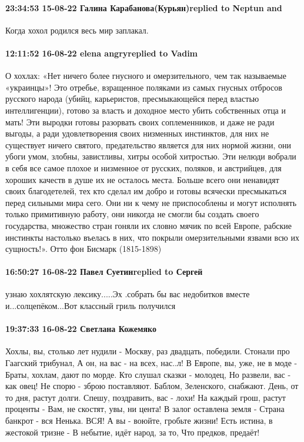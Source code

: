 \paragraph{23:34:53 15-08-22 Галина Карабанова(Курьян)replied to Neptun and}

Когда хохол родился весь мир заплакал.

\paragraph{12:11:52 16-08-22 elena angryreplied to Vadim}

\obeycr
О хохлах:
«Нет ничего более гнусного и омерзительного,
чем так называемые «украинцы»! Это отребье,
взращенное поляками из самых гнусных
отбросов русского народа (убийц, карьеристов,
пресмыкающейся перед властью интеллигенции),
готово за власть и доходное место убить
собственных отца и мать!
Эти выродки готовы разорвать своих
соплеменников, и даже не ради выгоды, а
ради удовлетворения своих низменных
инстинктов, для них не существует ничего
святого, предательство является для
них нормой жизни, они убоги умом, злобны,
завистливы, хитры особой хитростью. Эти
нелюди вобрали в себя все самое плохое
и низменное от русских, поляков, и австрийцев,
для хороших качеств в душе их не осталось
места. Больше всего они ненавидят своих
благодетелей, тех кто сделал им добро
и готовы всячески пресмыкаться перед
сильными мира сего.
Они ни к чему не приспособлены и
могут исполнять только примитивную работу,
они никогда не смогли бы создать своего
государства, множество стран гоняли
их словно мячик по всей Европе, рабские
инстинкты настолько въелась в них, что
покрыли омерзительными язвами всю их
сущность!».
Отто фон Бисмарк (1815-1898)
\restorecr

\paragraph{16:50:27 16-08-22 Павел Суетинreplied to Сергей}

узнаю хохлятскую лексику.....Эх .собрать бы вас недобитков вместе
и...солцепёком...Вот классный гриль получился

\paragraph{19:37:33 16-08-22 Светлана Кожемяко}

\obeycr
Хохлы, вы, столько лет нудили -
Москву, раз двадцать, победили.
Стонали про Гаагский трибунал,
А он, на вас - на всех, нас..л!
В Европе, вы, уже, не в моде -
Браты, хохлам, дают по морде.
Кто слушал сказки - молодец,
Но развели, вас - как овец!
Не спорю - зброю поставляют.
Баблом, Зеленского, снабжают.
День, от то дня, растут долги.
Спешу, поздравить, вас - лохи!
На каждый грош, растут проценты -
Вам, не скостят, увы, ни цента!
В залог оставлена земля -
Страна банкрот - вся Ненька.
ВСЯ!
А вы - воюйте, гробьте жизни!
Есть истина, в жестокой тризне -
В небытие, идёт народ, за то,
Что предков, предаёт!
\restorecr


